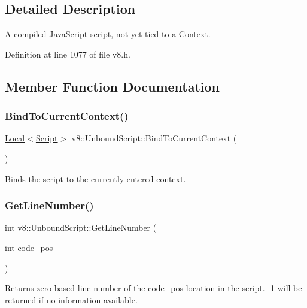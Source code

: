 \subsection{Detailed Description}
A compiled Java\+Script script, not yet tied to a Context. 

Definition at line 1077 of file v8.\+h.



\subsection{Member Function Documentation}
\mbox{\label{classv8_1_1UnboundScript_a0f3354dc71e3f831d10f6e82704a4c2b}} 
\subsubsection{\texorpdfstring{Bind\+To\+Current\+Context()}{BindToCurrentContext()}}
{\footnotesize\ttfamily \mbox{\hyperlink{classv8_1_1Local}{Local}}$<$\mbox{\hyperlink{classv8_1_1Script}{Script}}$>$ v8\+::\+Unbound\+Script\+::\+Bind\+To\+Current\+Context (\begin{DoxyParamCaption}{ }\end{DoxyParamCaption})}

Binds the script to the currently entered context. \mbox{\label{classv8_1_1UnboundScript_a020ca8bbe6ea2313aeedc993ccac3741}} 
\subsubsection{\texorpdfstring{Get\+Line\+Number()}{GetLineNumber()}}
{\footnotesize\ttfamily int v8\+::\+Unbound\+Script\+::\+Get\+Line\+Number (\begin{DoxyParamCaption}\item[{int}]{code\+\_\+pos }\end{DoxyParamCaption})}

Returns zero based line number of the code\+\_\+pos location in the script. -\/1 will be returned if no information available. \mbox{\label{classv8_1_1UnboundScript_ae237f900eb0821e4121f45de4151c7e8}} 
